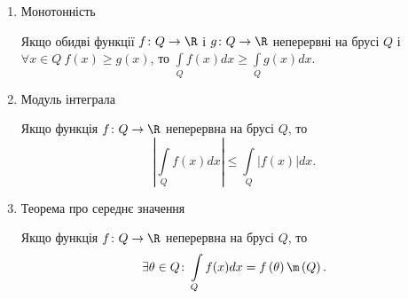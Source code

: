 \begin{enumerate}
\begin{intextProposition}
\end{intextProposition}
\item Монотонність
\begin{intextProposition}
Якщо обидві функції ${f\colon Q \to \R}$ і ${g\colon Q \to \R}$ неперервні на брусі $Q$ і ${\forall x\in Q\ f(x)\geq g(x)}$, то ${\int\limits_{Q} f(x) d x \geq \int\limits_{Q} g(x) d x.}$
\end{intextProposition}
\item Модуль інтеграла
\begin{intextProposition}
Якщо функція ${f\colon Q \to \R}$ неперервна на брусі $Q$, то
\[
\left|\int\limits_{Q} f(x) d x\right| \leq \int\limits_{Q} \left|f(x)\right| d x.
\]
\end{intextProposition}
\item Теорема про середнє значення
\begin{intextProposition}
Якщо функція ${f\colon Q \to \R}$ неперервна на брусі $Q$, то
\[
\exists \theta\in Q\colon \int\limits_{Q} f(x) d x = f\left(\theta\right)\m\left(Q\right).
\]
\end{intextProposition}
\end{enumerate}
